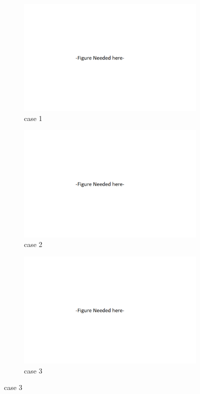 \begin{figure}[h]
	\centering
	\begin{subfigure}[h]{0.3\textwidth}
		\centering
		\includegraphics[width=\textwidth]{Figures/Placeholder.png}
		\caption{case 1}
		\label{}
	\end{subfigure}
	\begin{subfigure}[h]{0.3\textwidth}
		\centering
		\includegraphics[width=\textwidth]{Figures/Placeholder.png}
		\caption{case 2}
		\label{}
	\end{subfigure}
	\begin{subfigure}[h]{0.3\textwidth}
		\centering
		\includegraphics[width=\textwidth]{Figures/Placeholder.png}
		\caption{case 3}
		\label{}
	\end{subfigure}
\end{figure}

